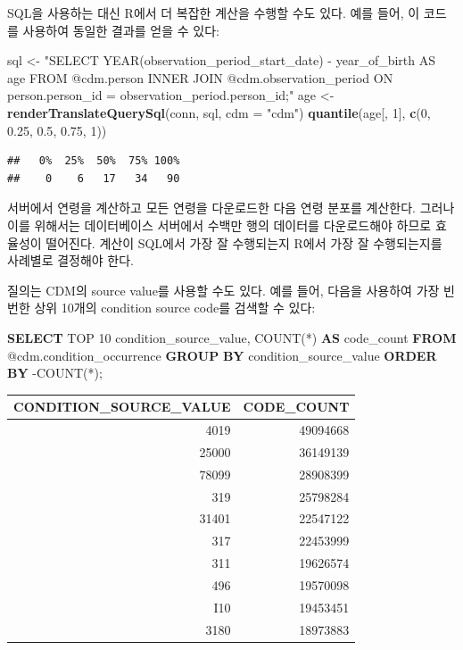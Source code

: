 \documentclass[10.5pt]{book}
\newenvironment{Shaded}{\begin{snugshade}}{\end{snugshade}}
\newcommand{\KeywordTok}[1]{\textcolor[rgb]{0.13,0.29,0.53}{\textbf{#1}}}
\newcommand{\DataTypeTok}[1]{\textcolor[rgb]{0.13,0.29,0.53}{#1}}
\newcommand{\DecValTok}[1]{\textcolor[rgb]{0.00,0.00,0.81}{#1}}
\newcommand{\FloatTok}[1]{\textcolor[rgb]{0.00,0.00,0.81}{#1}}
\newcommand{\StringTok}[1]{\textcolor[rgb]{0.31,0.60,0.02}{#1}}
\newcommand{\FunctionTok}[1]{\textcolor[rgb]{0.00,0.00,0.00}{#1}}
\newcommand{\NormalTok}[1]{#1}
\theoremstyle{definition}
\theoremstyle{definition}
\theoremstyle{definition}
\theoremstyle{remark}
\begin{document}
SQL을 사용하는 대신 R에서 더 복잡한 계산을 수행할 수도 있다. 예를 들어,
이 코드를 사용하여 동일한 결과를 얻을 수 있다:

\begin{Shaded}
\begin{Highlighting}[]
\NormalTok{sql <-}\StringTok{ "SELECT YEAR(observation_period_start_date) -}
\StringTok{               year_of_birth AS age}
\StringTok{FROM @cdm.person}
\StringTok{INNER JOIN @cdm.observation_period}
\StringTok{  ON person.person_id = observation_period.person_id;"}
\NormalTok{age <-}\StringTok{ }\KeywordTok{renderTranslateQuerySql}\NormalTok{(conn, sql, }\DataTypeTok{cdm =} \StringTok{"cdm"}\NormalTok{)}
\KeywordTok{quantile}\NormalTok{(age[, }\DecValTok{1}\NormalTok{], }\KeywordTok{c}\NormalTok{(}\DecValTok{0}\NormalTok{, }\FloatTok{0.25}\NormalTok{, }\FloatTok{0.5}\NormalTok{, }\FloatTok{0.75}\NormalTok{, }\DecValTok{1}\NormalTok{))}
\end{Highlighting}
\end{Shaded}

\begin{verbatim}
##   0%  25%  50%  75% 100% 
##    0    6   17   34   90
\end{verbatim}

서버에서 연령을 계산하고 모든 연령을 다운로드한 다음 연령 분포를
계산한다. 그러나 이를 위해서는 데이터베이스 서버에서 수백만 행의
데이터를 다운로드해야 하므로 효율성이 떨어진다. 계산이 SQL에서 가장 잘
수행되는지 R에서 가장 잘 수행되는지를 사례별로 결정해야 한다.

질의는 CDM의 source value를 사용할 수도 있다. 예를 들어, 다음을 사용하여
가장 빈번한 상위 10개의 condition source code를 검색할 수 있다:

\begin{Shaded}
\begin{Highlighting}[]
\KeywordTok{SELECT}\NormalTok{ TOP }\DecValTok{10}\NormalTok{ condition_source_value, }
  \FunctionTok{COUNT}\NormalTok{(*) }\KeywordTok{AS}\NormalTok{ code_count}
\KeywordTok{FROM}\NormalTok{ @cdm.condition_occurrence}
\KeywordTok{GROUP} \KeywordTok{BY}\NormalTok{ condition_source_value}
\KeywordTok{ORDER} \KeywordTok{BY}\NormalTok{ -COUNT(*);}
\end{Highlighting}
\end{Shaded}

\begin{longtable}[]{@{}rr@{}}
\toprule
CONDITION\_SOURCE\_VALUE & CODE\_COUNT\tabularnewline
\midrule
\endhead
4019 & 49094668\tabularnewline
25000 & 36149139\tabularnewline
78099 & 28908399\tabularnewline
319 & 25798284\tabularnewline
31401 & 22547122\tabularnewline
317 & 22453999\tabularnewline
311 & 19626574\tabularnewline
496 & 19570098\tabularnewline
I10 & 19453451\tabularnewline
3180 & 18973883\tabularnewline
\bottomrule
\end{longtable}
\end{document}
